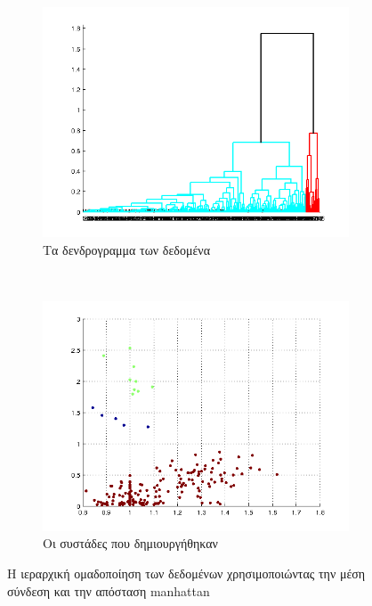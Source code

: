 \documentclass{assignment}
\begin{document}
\begin{figure}[htbp]
  \centering
  \begin{subfigure}[b]{0.5\textwidth}
     \includegraphics[width=\textwidth,height=0.25\textheight]{matlab/hierarchical_dendogram_average_manhattan.png}
  \caption{Τα δενδρογραμμα των δεδομένα}
  \end{subfigure}%
   ~ %
  \begin{subfigure}[b]{0.5\textwidth}
    \includegraphics[width=\textwidth,height=0.25\textheight]{matlab/identified_clusters_average_manhattan.png}
  \caption{Οι συστάδες που δημιουργήθηκαν}
  \end{subfigure}
  \caption{Η ιεραρχική ομαδοποίηση των δεδομένων χρησιμοποιώντας την μέση σύνδεση και την απόσταση manhattan}
\label{fig:clustering_average_manhattan}
\end{figure}
\end{document}
